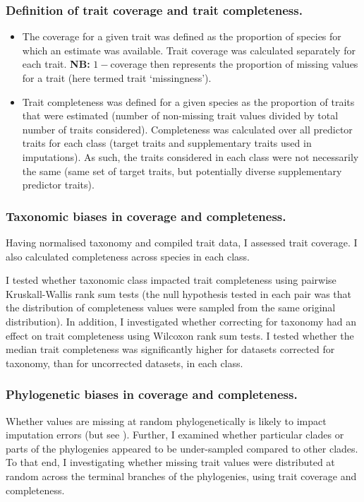 \subsubsection{Definition of trait coverage and trait completeness.}
\begin{itemize}
\item The coverage for a given trait was defined as the proportion of species for which an estimate was available. Trait coverage was calculated separately for each trait. \textbf{NB:} $1-$coverage then represents the proportion of missing values for a trait (here termed trait `missingness').
\item Trait completeness was defined for a given species as the proportion of traits that were estimated (number of non-missing trait values divided by total number of traits considered). Completeness was calculated over all predictor traits for each class (target traits and supplementary traits used in imputations). As such, the traits considered in each class were not necessarily the same (same set of target traits, but potentially diverse supplementary predictor traits).
\end{itemize}

\subsubsection{Taxonomic biases in coverage and completeness.}
Having normalised taxonomy and compiled trait data, I assessed trait coverage. I also calculated completeness across species in each class.

I tested whether taxonomic class impacted trait completeness using pairwise Kruskall-Wallis rank sum tests (the null hypothesis tested in each pair was that the distribution of completeness values were sampled from the same original distribution).
In addition, I investigated whether correcting for taxonomy had an effect on trait completeness using Wilcoxon rank sum tests. I tested whether the median trait completeness was significantly higher for datasets corrected for taxonomy, than for uncorrected datasets, in each class.

\subsubsection{Phylogenetic biases in coverage and completeness.}
Whether values are missing at random phylogenetically is likely to impact imputation errors (but see \citet{Penone2014}). Further, I examined whether particular clades or parts of the phylogenies appeared to be under-sampled compared to other clades. To that end, I investigating whether missing trait values were distributed at random across the terminal branches of the phylogenies, using trait coverage and completeness. 

